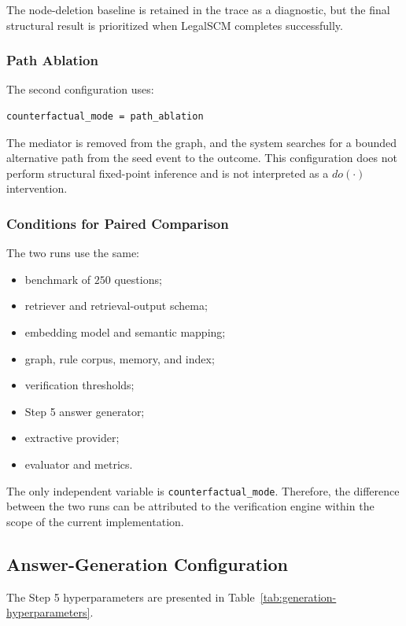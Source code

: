 The node-deletion baseline is retained in the trace as a diagnostic, but the
final structural result is prioritized when LegalSCM completes successfully.

\subsubsection{Path Ablation}

The second configuration uses:

\begin{verbatim}
counterfactual_mode = path_ablation
\end{verbatim}

The mediator is removed from the graph, and the system searches for a bounded
alternative path from the seed event to the outcome. This configuration does
not perform structural fixed-point inference and is not interpreted as a
\(do(\cdot)\) intervention.

\subsubsection{Conditions for Paired Comparison}

The two runs use the same:

\begin{itemize}
    \item benchmark of \(250\) questions;
    \item retriever and retrieval-output schema;
    \item embedding model and semantic mapping;
    \item graph, rule corpus, memory, and index;
    \item verification thresholds;
    \item Step 5 answer generator;
    \item extractive provider;
    \item evaluator and metrics.
\end{itemize}

The only independent variable is \texttt{counterfactual\_mode}. Therefore,
the difference between the two runs can be attributed to the verification
engine within the scope of the current implementation.

\subsection{Answer-Generation Configuration}

The Step 5 hyperparameters are presented in
Table~\ref{tab:generation-hyperparameters}.

